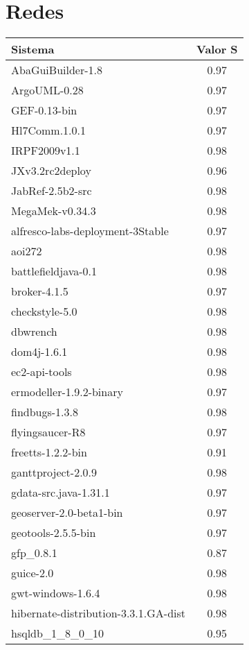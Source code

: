 \chapter{Redes}


\begin{center}
\begin{longtable}{| p{10cm} | c |}
	\hline
	\textbf{Sistema} & \textbf{Valor} S \\ \hline
	\hline
	AbaGuiBuilder-1.8 & 0.97 \\ \hline
	ArgoUML-0.28 & 0.97 \\ \hline
	GEF-0.13-bin & 0.97 \\ \hline
	Hl7Comm.1.0.1 & 0.97 \\ \hline
	IRPF2009v1.1 & 0.98 \\ \hline
	JXv3.2rc2deploy & 0.96 \\ \hline
	JabRef-2.5b2-src & 0.98 \\ \hline
	MegaMek-v0.34.3 & 0.98 \\ \hline
	alfresco-labs-deployment-3Stable & 0.97 \\ \hline
	aoi272 & 0.98 \\ \hline
	battlefieldjava-0.1 & 0.98 \\ \hline
	broker-4.1.5 & 0.97 \\ \hline
	checkstyle-5.0 & 0.98 \\ \hline
	dbwrench & 0.98 \\ \hline
	dom4j-1.6.1 & 0.98 \\ \hline
	ec2-api-tools & 0.98 \\ \hline
	ermodeller-1.9.2-binary & 0.97 \\ \hline
	findbugs-1.3.8 & 0.98 \\ \hline
	flyingsaucer-R8 & 0.97 \\ \hline
	freetts-1.2.2-bin & 0.91 \\ \hline
	ganttproject-2.0.9 & 0.98 \\ \hline
	gdata-src.java-1.31.1 & 0.97 \\ \hline
	geoserver-2.0-beta1-bin & 0.97 \\ \hline
	geotools-2.5.5-bin & 0.97 \\ \hline
	gfp\_0.8.1 & 0.87 \\ \hline
	guice-2.0 & 0.98 \\ \hline
	gwt-windows-1.6.4 & 0.98 \\ \hline
	hibernate-distribution-3.3.1.GA-dist & 0.98 \\ \hline
	hsqldb\_1\_8\_0\_10 & 0.95 \\ \hline

\end{longtable}
\end{center}
